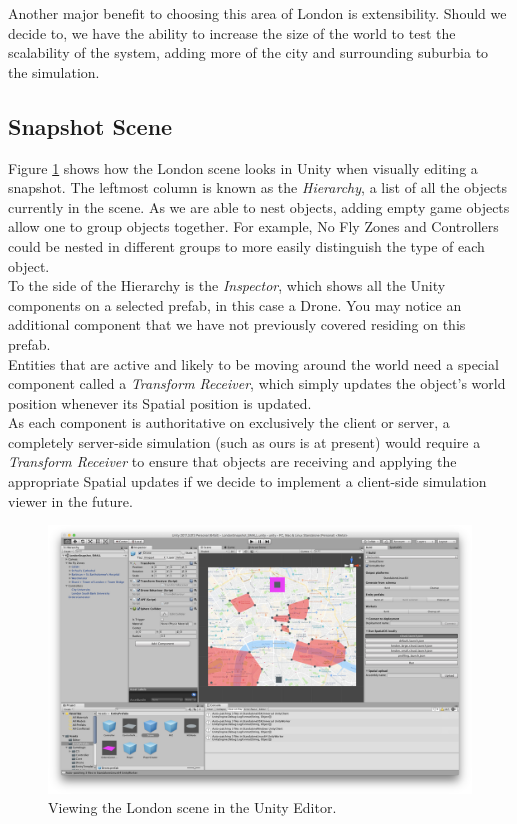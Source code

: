 \documentclass[a4paper,12pt,titlepage]{article}
\begin{document}
Another major benefit to choosing this area of London is extensibility. Should we decide to, we have the ability to increase the size of the world to test the scalability of the system, adding more of the city and surrounding suburbia to the simulation.

\subsection{Snapshot Scene}
Figure \ref{fig:unity_londonsnapshotsmallexample} shows how the London scene looks in Unity when visually editing a snapshot. The leftmost column is known as the \textit{Hierarchy}, a list of all the objects currently in the scene. As we are able to nest objects, adding empty game objects allow one to group objects together. For example, No Fly Zones and Controllers could be nested in different groups to more easily distinguish the type of each object.\\

To the side of the Hierarchy is the \textit{Inspector}, which shows all the Unity components on a selected prefab, in this case a Drone. You may notice an additional component that we have not previously covered residing on this prefab.\\

Entities that are active and likely to be moving around the world need a special component called a \textit{Transform Receiver}, which simply updates the object's world position whenever its Spatial position is updated.\\

As each component is authoritative on exclusively the client or server, a completely server-side simulation (such as ours is at present) would require a \textit{Transform Receiver} to ensure that objects are receiving and applying the appropriate Spatial updates if we decide to implement a client-side simulation viewer in the future.

\begin{figure}[!hbpt]
  \center
  \includegraphics[width=\linewidth]{img/unity_londonsnapshotsmallexample.png}
  \caption{Viewing the London scene in the Unity Editor.}
  \label{fig:unity_londonsnapshotsmallexample}
\end{figure}
\end{document}
